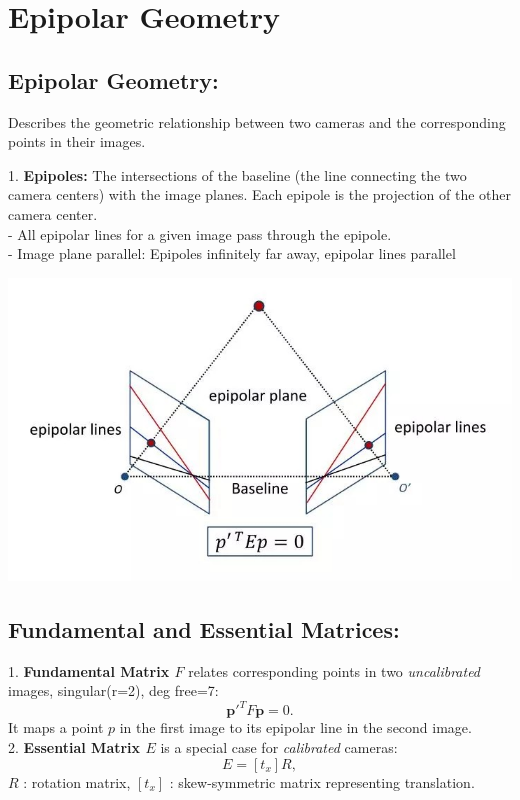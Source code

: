 \section{Epipolar Geometry}
\subsection*{Epipolar Geometry:} Describes the geometric relationship between two cameras and the corresponding points in their images. 

1. \textbf{Epipoles:} The intersections of the baseline (the line connecting the two camera centers) with the image planes. Each epipole is the projection of the other camera center. \\
   - All epipolar lines for a given image pass through the epipole. \\
   - Image plane parallel: Epipoles infinitely far away, epipolar lines parallel

   
\includegraphics[width=1\linewidth]{images/l12-epipolar.png}


\subsection*{Fundamental and Essential Matrices:}
1. \textbf{Fundamental Matrix \(F\)} relates corresponding points in two \textit{uncalibrated} images, singular(r=2), deg free=7:
     \[
     \mathbf{{p'}}^T F \mathbf{{p}} = 0.
     \]
     It maps a point \(p\) in the first image to its epipolar line in the second image. \\
2. \textbf{Essential Matrix \(E\)} is a special case for \textit{calibrated} cameras:
     \[
     E = [t_x] R,
     \]
     \(R\) : rotation matrix, \([t_x]\) : skew-symmetric matrix representing translation. \\


